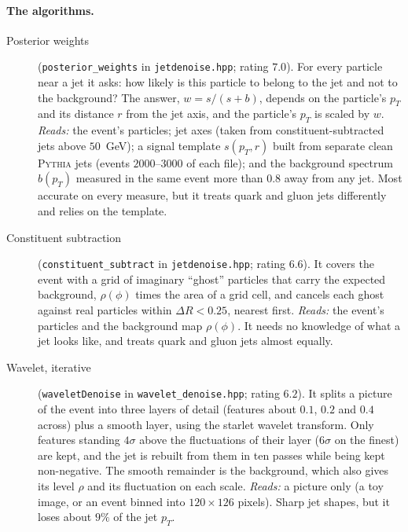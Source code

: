 \paragraph{The algorithms.}
\begin{description}
  \item[Posterior weights] (\texttt{posterior\_weights} in
    \texttt{jetdenoise.hpp}; rating $7.0$).
    For every particle near a jet it asks: how likely is this particle to
    belong to the jet and not to the background? The answer,
    $w=s/(s+b)$, depends on the particle's $p_T$ and its distance $r$ from the
    jet axis, and the particle's $p_T$ is scaled by $w$.
    \emph{Reads:} the event's particles; jet axes (taken from
    constituent-subtracted jets above $50$~GeV); a signal template $s(p_T,r)$
    built from separate clean \textsc{Pythia} jets (events $2000$--$3000$ of
    each file); and the background spectrum $b(p_T)$ measured in the same event
    more than $0.8$ away from any jet. Most accurate on every measure, but it
    treats quark and gluon jets differently and relies on the template.

  \item[Constituent subtraction] (\texttt{constituent\_subtract} in
    \texttt{jetdenoise.hpp}; rating $6.6$).
    It covers the event with a grid of imaginary ``ghost'' particles that carry
    the expected background, $\rho(\phi)$ times the area of a grid cell, and
    cancels each ghost against real particles within $\Delta R<0.25$, nearest
    first. \emph{Reads:} the event's particles and the background map
    $\rho(\phi)$. It needs no knowledge of what a jet looks like, and treats
    quark and gluon jets almost equally.

  \item[Wavelet, iterative] (\texttt{waveletDenoise} in
    \texttt{wavelet\_denoise.hpp}; rating $6.2$).
    It splits a picture of the event into three layers of detail (features
    about $0.1$, $0.2$ and $0.4$ across) plus a smooth layer, using the starlet
    wavelet transform. Only features standing $4\sigma$ above the fluctuations
    of their layer ($6\sigma$ on the finest) are kept, and the jet is rebuilt
    from them in ten passes while being kept non-negative. The smooth remainder
    is the background, which also gives its level $\rho$ and its fluctuation on
    each scale. \emph{Reads:} a picture only (a toy image, or an event binned
    into $120\times126$ pixels). Sharp jet shapes, but it loses about $9\%$ of
    the jet $p_T$.


\end{description}
